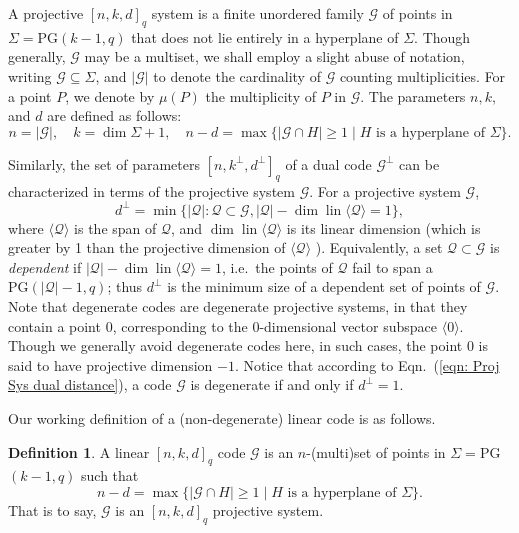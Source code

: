 \documentclass[11pt,a4paper]{amsart}
\newcommand{\G}{\mathcal{G}}
\theoremstyle{plain}
\theoremstyle{definition}
\newtheorem{definition}[theorem]{Definition}
\theoremstyle{remark}
\begin{document}
	A projective $[n, k, d]_q$ system is a finite unordered family $\G$ of points  in $\Sigma =\text{PG}(k-1,q)$ that does not lie entirely in a  hyperplane  of $\Sigma$. Though generally, $\G$ may be a multiset, we shall employ a slight abuse of notation, writing  $\mathcal{G} \subseteq \Sigma$, and  $|\G|$ to denote the cardinality of $\G$ counting multiplicities. For a point $P$, we denote by $\mu(P)$ the multiplicity of $P$ in $\G$. The parameters $n, k,$ and $ d $ are defined as follows:
	\begin{equation}\label{eqn: Proj Sys Code parameters}
		n=|\G|, \quad k=\operatorname{dim} \Sigma +1, \quad n-d= \max \{|\G \cap H| \geq 1 \mid  H \text{ is a hyperplane of } \Sigma\}.
	\end{equation}

	Similarly, the set of parameters $[n,k^\perp,d^{\perp}]_q$ of a dual code $\G^\perp$ can  be characterized in terms of the projective system $\mathcal{G}$. For a projective system $\mathcal{G}$,
	\begin{equation}\label{eqn: Proj Sys dual distance}
		d^{\perp}=\min \{|\mathcal{Q}|: \mathcal{Q} \subset \G,|\mathcal{Q}|-\operatorname{dim} \operatorname{lin}\langle\mathcal{Q}\rangle=1\},
	\end{equation}
	where $\langle\mathcal{Q}\rangle$ is the span of $\mathcal{Q}$, and $\operatorname{dim} \operatorname{lin}\langle\mathcal{Q}\rangle$ is its linear dimension (which is greater by 1 than the projective dimension of $\langle\mathcal{Q}\rangle$ ). Equivalently, a set $\mathcal{Q}\subset\mathcal{G}$ is \textit{dependent} if $|\mathcal{Q}|-\operatorname{dim}\operatorname{lin}\langle\mathcal{Q}\rangle=1$, i.e.\ the points of $\mathcal{Q}$ fail to span a $\mathrm{PG}(|\mathcal{Q}|-1,q)$; thus $d^\perp$ is the minimum size of a dependent set of points of $\mathcal{G}$. Note that degenerate codes are degenerate projective systems, in that they contain  a point $0$, corresponding to the $0$-dimensional vector subspace $\langle 0 \rangle$. Though we generally avoid degenerate codes here, in such cases, the point $0$ is said to have projective dimension $-1$.  Notice that according to Eqn.~(\ref{eqn: Proj Sys dual distance}), a code $\G$ is degenerate if and only if $d^\perp=1$.

	Our working definition of a (non-degenerate) linear code is as follows.

	\begin{definition}\label{defn: linear Code by PS}
		A linear $[n,k,d]_q$ code $\G$ is an $n$-(multi)set of points in $\Sigma = $PG$(k-1,q)$ such that
		\[
		n-d= \max \{|\G \cap H| \geq 1 \mid  H \text{ is a hyperplane of } \Sigma\}.
		\]
		That is to say, $\G$ is an $[n,k,d]_q$ projective system.
	\end{definition}
\end{document}
